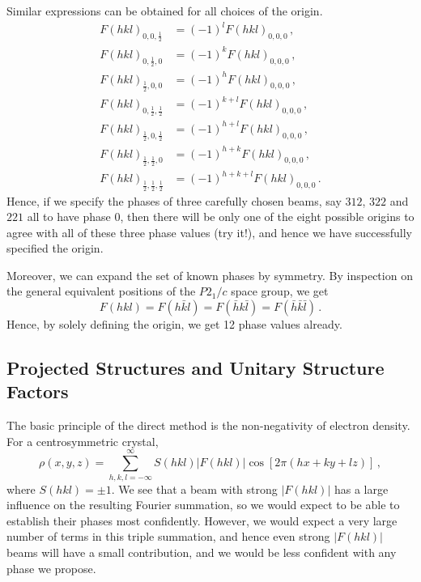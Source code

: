 \documentclass{article}
\theoremstyle{plain}\theoremheaderfont{\normalfont\itshape}\theorembodyfont{\rmfamily}\theoremseparator{.}\newtheorem*{rem}{Remark}\newtheorem*{ex}{Example}\newtheorem*{proof}{Proof}\newtheorem*{altp}{Alternative proof}
\theoremstyle{plain}\theoremheaderfont{\normalfont\bfseries}\theorembodyfont{\rmfamily}\theoremseparator{.}\newtheorem{thm}{Theorem}[section]\newtheorem{lem}[thm]{Lemma}\newtheorem{prop}[thm]{Proposition}\newtheorem*{cor}{Corollary}\newtheorem{defn}[thm]{Definition}\newtheorem{clm}[thm]{Claim}\newtheorem{clminproof}{Claim}\newtheorem*{law}{Law}\newtheorem{pos}[thm]{Postulate}
\theoremstyle{break}\theoremheaderfont{\normalfont\itshape}\theorembodyfont{\rmfamily}\theoremseparator{.\medskip}\newtheorem*{proofskip}{Proof}\newtheorem*{exs}{Examples}\newtheorem*{rems}{Remarks}
\theoremstyle{break}\theoremheaderfont{\normalfont\bfseries}\theorembodyfont{\rmfamily}\theoremseparator{.\medskip}\newtheorem{lemskip}[thm]{Lemma}\newtheorem{defnskip}[thm]{Definition}\newtheorem{propskip}[thm]{Proposition}\newtheorem{thmskip}[thm]{Theorem}
\numberwithin{equation}{section}
\newcommand{\abs}[1]{\left| #1 \right|}
\begin{document}
    Similar expressions can be obtained for all choices of the origin.
    \begin{equation}
        \begin{aligned}
            F(hkl)_{0,0,\frac{1}{2}}&=(-1)^l F(hkl)_{0,0,0}\,,\\
            F(hkl)_{0,\frac{1}{2},0}&=(-1)^k F(hkl)_{0,0,0}\,,\\
            F(hkl)_{\frac{1}{2},0,0}&=(-1)^h F(hkl)_{0,0,0}\,,\\
            F(hkl)_{0,\frac{1}{2},\frac{1}{2}}&=(-1)^{k+l} F(hkl)_{0,0,0}\,,\\
            F(hkl)_{\frac{1}{2},0,\frac{1}{2}}&=(-1)^{h+l} F(hkl)_{0,0,0}\,,\\
            F(hkl)_{\frac{1}{2},\frac{1}{2},0}&=(-1)^{h+k} F(hkl)_{0,0,0}\,,\\
            F(hkl)_{\frac{1}{2},\frac{1}{2},\frac{1}{2}}&=(-1)^{h+k+l} F(hkl)_{0,0,0}\,.
        \end{aligned}
    \end{equation}
    Hence, if we specify the phases of three carefully chosen beams, say \(312\), \(322\) and \(221\) all to have phase \(0\), then there will be only one of the eight possible origins to agree with all of these three phase values (try it!), and hence we have successfully specified the origin.

    Moreover, we can expand the set of known phases by symmetry. By inspection on the general equivalent positions of the \(P2_1/c\) space group, we get
    \begin{equation}
        F(hkl)=F(h\bar{k}l)=F(\bar{h}k\bar{l})=F(\bar{h}\bar{k}\bar{l})\,.
    \end{equation}
    Hence, by solely defining the origin, we get 12 phase values already.

    \subsection{Projected Structures and Unitary Structure Factors}
    The basic principle of the direct method is the non-negativity of electron density. For a centrosymmetric crystal,
    \begin{equation}
        \rho(x,y,z)=\sum_{h,k,l=-\infty}^{\infty}S(hkl)\abs{F(hkl)}\cos[2\pi(hx+ky+lz)]\,,
    \end{equation}
    where \(S(hkl)=\pm 1\). We see that a beam with strong \(\abs{F(hkl)}\) has a large influence on the resulting Fourier summation, so we would expect to be able to establish their phases most confidently. However, we would expect a very large number of terms in this triple summation, and hence even strong \(\abs{F(hkl)}\) beams will have a small contribution, and we would be less confident with any phase we propose.
\end{document}
